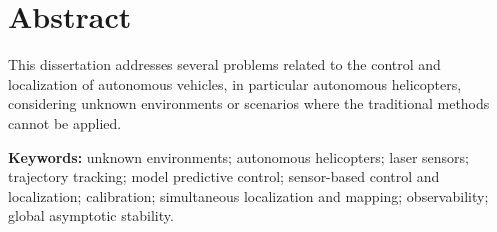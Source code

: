 \chapter{Abstract}

This dissertation addresses several problems related to the control and 
localization of autonomous vehicles, in particular autonomous helicopters, 
considering unknown environments or scenarios where the traditional methods 
cannot be applied.




\noindent \textbf{Keywords:} 
unknown environments;
autonomous helicopters;
laser sensors;
trajectory tracking;
model predictive control;
sensor-based control and localization; 
calibration;
simultaneous localization and mapping;
observability;
global asymptotic stability.


